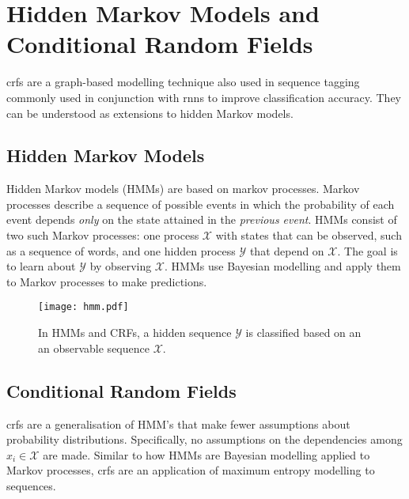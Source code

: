 \section[Conditional Random Fields]{Hidden Markov Models and Conditional Random Fields}

\Glspl{crf}\cite{originalCRF} are a graph-based modelling technique also used in sequence tagging commonly used in conjunction with \glspl{rnn} to improve classification accuracy. They can be understood as extensions to hidden Markov models.

\subsection{Hidden Markov Models}

    Hidden Markov models (HMMs) are based on markov processes. Markov processes describe a sequence of possible events in which the probability of each event depends \textit{only} on the state attained in the \textit{previous event}\cite{gagniuc2017markov}.
    HMMs consist of two such Markov processes: one process $\mathcal{X}$ with states that can be observed, such as a sequence of words, and one hidden process $\mathcal{Y}$ that depend on $\mathcal{X}$. The goal is to learn about $\mathcal{Y}$ by observing $\mathcal{X}$. HMMs use Bayesian modelling and apply them to Markov processes to make predictions\cite{klinger2007classical}.
   
    \begin{figure}[t]
        \centering
        \texttt{[image: hmm.pdf]}
        \caption{In HMMs and CRFs, a hidden sequence $\mathcal{Y}$ is classified based on an an observable sequence $\mathcal{X}$.}
        \label{fig: HMM and CRF}
    \end{figure}

\subsection{Conditional Random Fields}
    \Glspl{crf} are a generalisation of HMM's that make fewer assumptions about probability distributions. Specifically, no assumptions on the dependencies among $x_{i} \in \mathcal{X}$ are made\cite{klinger2007classical}. Similar to how HMMs are Bayesian modelling applied to Markov processes, \glspl{crf} are an application of maximum entropy modelling to sequences\cite{klinger2007classical}.